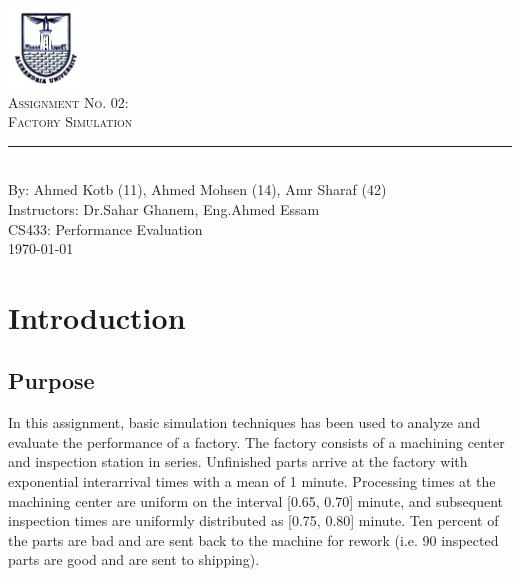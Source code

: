 \documentclass[aps,letterpaper,10pt]{revtex4}
\newcommand{\labno}{02}
\newcommand{\labtitle}{Factory Simulation}
\newcommand{\authorname}{Ahmed Kotb (11), Ahmed Mohsen (14), Amr Sharaf (42)}
\newcommand{\professor}{Dr.Sahar Ghanem, Eng.Ahmed Essam}
\newcommand{\classno}{CS433: Performance Evaluation}
\begin{document}


\begin{titlepage}
\begin{center}
\includegraphics[width=2cm]{Logo_Alexandria_University.jpg}\\
{\LARGE \textsc{Assignment No. \labno:} \\ \vspace{4pt}}
{\Large \textsc{\labtitle} \\ \vspace{4pt}} 
\rule[13pt]{\textwidth}{1pt} \\ \vspace{150pt}
{\large By: \authorname \\ \vspace{10pt}
Instructors: \professor \\ \vspace{10pt}
\classno \\ \vspace{10pt}
\today}
\end{center}
\end{titlepage}


\section{Introduction}
\subsection{Purpose}
In this assignment, basic simulation techniques has been used to analyze and evaluate the performance of a factory. The factory consists of a machining center and inspection station in series. Unfinished parts arrive at the factory with exponential interarrival times with a mean of 1 minute. Processing times at the machining center are uniform on the interval [0.65, 0.70] minute, and subsequent inspection times are uniformly distributed as [0.75, 0.80] minute. Ten percent of the parts are bad and are sent back to the machine for rework (i.e. 90%
inspected parts are good and are sent to shipping).
\end{document}
